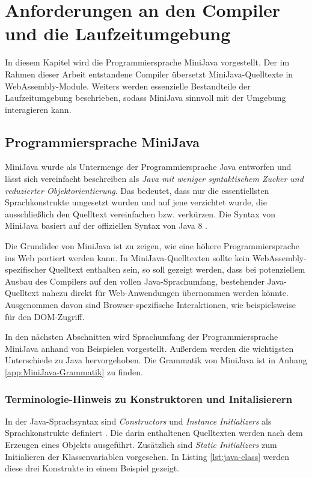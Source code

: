 \chapter{Anforderungen an den Compiler und die Laufzeitumgebung}

In diesem Kapitel wird die Programmiersprache MiniJava vorgestellt. Der im Rahmen dieser Arbeit entstandene Compiler übersetzt MiniJava-Quelltexte in WebAssembly-Module. Weiters werden essenzielle Bestandteile der Laufzeitumgebung beschrieben, sodass MiniJava sinnvoll mit der Umgebung interagieren kann.

\section{Programmiersprache MiniJava}

MiniJava wurde als Untermenge der Programmiersprache Java entworfen und lässt sich vereinfacht beschreiben als \emph{Java mit weniger syntaktischem Zucker und reduzierter Objektorientierung}. Das bedeutet, dass nur die essentiellsten Sprachkonstrukte umgesetzt wurden und auf jene verzichtet wurde, die ausschließlich den Quelltext vereinfachen bzw. verkürzen. Die Syntax von MiniJava basiert auf der offiziellen Syntax von Java 8 \cite{Java8Specification}.

Die Grundidee von MiniJava ist zu zeigen, wie eine höhere Programmiersprache ins Web portiert werden kann. In MiniJava-Quelltexten sollte kein WebAssembly-spezifischer Quelltext enthalten sein, so soll gezeigt werden, dass bei potenziellem Ausbau des Compilers auf den vollen Java-Sprachumfang, bestehender Java-Quelltext nahezu direkt für Web-Anwendungen übernommen werden könnte. Ausgenommen davon sind Browser-spezifische Interaktionen, wie beispielsweise für den DOM-Zugriff.

In den nächsten Abschnitten wird Sprachumfang der Programmiersprache MiniJava anhand von Beispielen vorgestellt. Außerdem werden die wichtigsten Unterschiede zu Java hervorgehoben. Die Grammatik von MiniJava ist in Anhang \ref{app:MiniJava-Grammatik} zu finden.

\subsection{Terminologie-Hinweis zu Konstruktoren und Initalisierern}

In der Java-Sprachsyntax sind \emph{Constructors} und \emph{Instance Initializers} als Sprachkonstrukte definiert \cite{Java8Specification}. Die darin enthaltenen Quelltexten werden nach dem Erzeugen eines Objekts ausgeführt. Zusätzlich sind \emph{Static Initializers} zum Initialieren der Klassenvariablen vorgesehen. In Listing \ref{lst:java-class} werden diese drei Konstrukte in einem Beispiel gezeigt.

